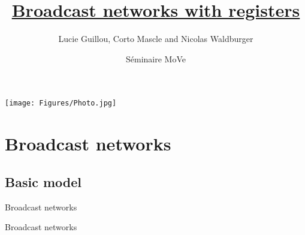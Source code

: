 \documentclass{beamer}
\begin{document}
	
	\title[]{\underline{Broadcast networks with registers}}
	\date[]{Séminaire MoVe}
	\author[]{\small Lucie Guillou, Corto Mascle and Nicolas Waldburger}
%	
\begin{frame}
	\titlepage
\end{frame}	

\begin{frame}
	\texttt{[image: Figures/Photo.jpg]}
\end{frame}

\begin{frame}
	\tableofcontents
\end{frame}

\section{Broadcast networks}

\subsection{Basic model}

\begin{frame}
	\tableofcontents[currentsubsection]
\end{frame}


\begin{frame}{Broadcast networks}
	
\end{frame}


\begin{frame}{Broadcast networks}
	
\end{frame}
\end{document}
